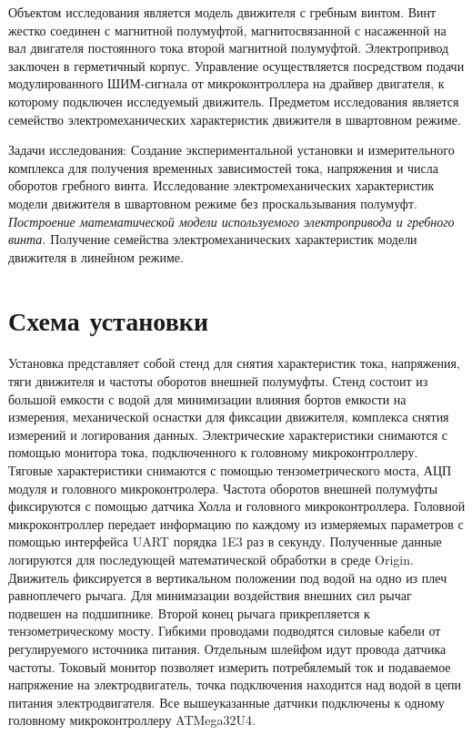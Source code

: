 \documentclass[12pt, twoside]{article}
\begin{document}
Объектом исследования является модель движителя с гребным винтом. Винт жестко соединен с магнитной полумуфтой, магнитосвязанной с насаженной на вал двигателя постоянного тока второй магнитной полумуфтой. Электропривод заключен в герметичный корпус. Управление осуществляется посредством подачи модулированного ШИМ-сигнала от микроконтроллера на драйвер двигателя, к которому подключен исследуемый движитель. 
Предметом исследования является семейство электромеханических характеристик движителя в швартовном режиме.

Задачи исследования:
Создание экспериментальной установки и измерительного комплекса для получения временных зависимостей тока, напряжения и числа оборотов гребного винта.
Исследование электромеханических характеристик модели движителя в швартовном режиме без проскальзывания полумуфт.
\textit{Построение математической модели используемого электропривода и гребного винта.}
Получение семейства электромеханических характеристик модели движителя в линейном режиме.

\section{Схема установки}

Установка представляет собой стенд для снятия характеристик тока, напряжения, тяги движителя и частоты оборотов внешней полумуфты.
Стенд состоит из большой емкости с водой для минимизации влияния бортов емкости на измерения, механической оснастки для фиксации движителя, комплекса снятия измерений и логирования данных. 
 Электрические характеристики снимаются с помощью монитора тока, подключенного к головному микроконтроллеру. Тяговые характеристики снимаются с помощью тензометрического моста, АЦП модуля и головного микроконтролера. Частота оборотов внешней полумуфты фиксируются с помощью датчика Холла и головного микроконтроллера. Головной микроконтроллер передает информацию по каждому из измеряемых параметров с помощью интерфейса UART порядка 1E3 раз в секунду. Полученные данные логируются для последующей математической обработки в среде Origin.
Движитель фиксируется в вертикальном положении под водой на одно из плеч равноплечего рычага. Для минимазации воздействия внешних сил рычаг подвешен на подшипнике. Второй конец рычага прикрепляется к тензометрическому мосту.
Гибкими проводами подводятся силовые кабели от регулируемого источника питания. Отдельным шлейфом идут провода датчика частоты. Токовый монитор позволяет измерить потребялемый ток и подаваемое напряжение на электродвигатель, точка подключения находится над водой в цепи питания электродвигателя.
Все вышеуказанные датчики подключены к одному головному микроконтроллеру ATMega32U4.
\end{document}
